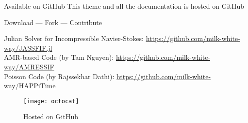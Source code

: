 \documentclass[\string~/GitHub/sthlmNordBeamerTheme/sthlmNordLightDemo.tex]{subfiles}
\begin{document}
\begin{frame}[c]{Available on GitHub}
  This theme and all the documentation is hosted on GitHub \\
  \vspace{0.5em}
  \begin{center}
	\large{Download --- Fork --- Contribute}

	Julian Solver for Incompressible Navier-Stokes: \url{https://github.com/milk-white-way/JASSFIF.jl}
    \\
    AMR-based Code (by Tam Nguyen): \url{https://github.com/milk-white-way/AMRESSIF}
    \\
    Poisson Code (by Rajssekhar Dathi): \url{https://github.com/milk-white-way/HAPPiTime}
    
	\vspace{0.5em}

	\begin{figure}
	  \centerline{\texttt{[image: octocat]}}
	  \caption{Hosted on GitHub}
	\end{figure}

  \end{center}
\end{frame}
\end{document}
